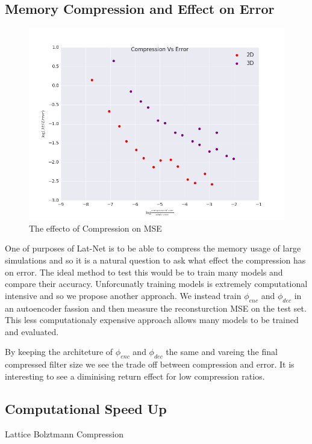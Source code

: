 \documentclass{article}
\begin{document}
\subsection{Memory Compression and Effect on Error}
\begin{figure}[!t]
\centering
\includegraphics[scale=0.3]{../test/figs/compression_error_plot.png}
\caption{The effecto of Compression on MSE}
\label{}
\end{figure}

One of purposes of Lat-Net is to be able to compress the memory usage of large simulations and so it is a natural question to ask what effect the compression has on error. The ideal method to test this would be to train many models and compare their accuracy. Unforcunatly training models is extremely computational intensive and so we propose another approach. We instead train $\phi_{enc}$ and $\phi_{dec}$ in an autoencoder fassion and then measure the reconsturction MSE on the test set. This less computationaly expensive approach allows many models to be trained and evaluated.

By keeping the architeture of $\phi_{enc}$ and $\phi_{dec}$ the same and vareing the final compressed filter size we see the trade off between compression and error. It is interesting to see a diminising return effect for low compression ratios.

\subsection{Computational Speed Up}

Lattice Bolztmann Compression 
\end{document}
